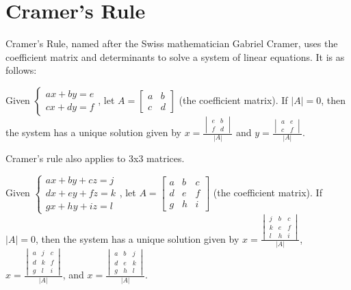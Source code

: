 \documentclass{report}
\begin{document}
\section{Cramer's Rule}

Cramer's Rule, named after the Swiss mathematician Gabriel Cramer, uses the coefficient matrix and determinants to solve a system of linear equations. It is as follows:

Given 
$
    \begin{cases}
        ax+by=e \\
        cx+dy=f
    \end{cases}
$, 
let 
$
    A=
    \begin{bmatrix}
        a & b \\
        c & d
    \end{bmatrix}
$ 
(the coefficient matrix). If $|A|=0$, then the system has a unique solution given by
$
    x=\frac{
        \begin{vmatrix}
            e & b \\
            f & d
        \end{vmatrix}
    }{|A|}
$ 
and
$
    y=\frac{
        \begin{vmatrix}
            a & e \\
            c & f
        \end{vmatrix}
    }{|A|}
$.

Cramer's rule also applies to 3x3 matrices.

Given 
$
    \begin{cases}
        ax+by+cz=j \\
        dx+ey+fz=k \\
        gx+hy+iz=l
    \end{cases}
$, let 
$
    A=
    \begin{bmatrix}
        a & b & c \\
        d & e & f \\
        g & h & i
    \end{bmatrix}
$ (the coefficient matrix). If $|A|=0$, then the system has a unique solution given by 
$
    x=\frac{
        \begin{vmatrix}
            j & b & c \\
            k & e & f \\
            l & h & i
        \end{vmatrix}
    }{|A|}
$, 
$
    x=\frac{
        \begin{vmatrix}
            a & j & c \\
            d & k & f \\
            g & l & i
        \end{vmatrix}
    }{|A|}
$, and 
$
    x=\frac{
        \begin{vmatrix}
            a & b & j \\
            d & e & k \\
            g & h & l
        \end{vmatrix}
    }{|A|}
$.
\end{document}
